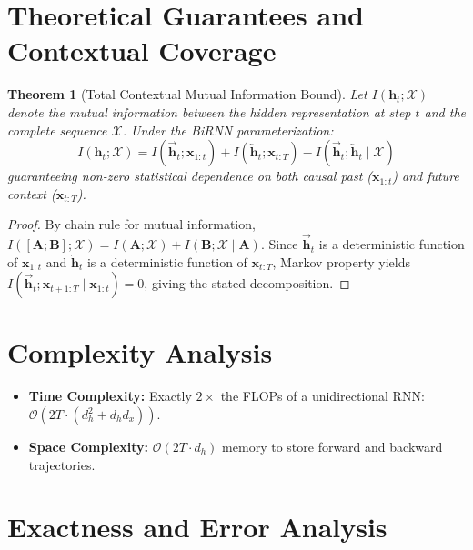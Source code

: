\documentclass[11pt,a4paper]{article}
\newtheorem{theorem}{Theorem}
\theoremstyle{definition}
\begin{document}
\section{Theoretical Guarantees and Contextual Coverage}

\begin{theorem}[Total Contextual Mutual Information Bound]
\label{thm:birnn_context}
Let $I(\mathbf{h}_t; \mathcal{X})$ denote the mutual information between the hidden representation at step $t$ and the complete sequence $\mathcal{X}$. Under the BiRNN parameterization:
\begin{equation}
I(\mathbf{h}_t; \mathcal{X}) = I(\overrightarrow{\mathbf{h}}_t; \mathbf{x}_{1:t}) + I(\overleftarrow{\mathbf{h}}_t; \mathbf{x}_{t:T}) - I(\overrightarrow{\mathbf{h}}_t; \overleftarrow{\mathbf{h}}_t \mid \mathcal{X})
\end{equation}
guaranteeing non-zero statistical dependence on both causal past ($\mathbf{x}_{1:t}$) and future context ($\mathbf{x}_{t:T}$).
\end{theorem}

\begin{proof}
By chain rule for mutual information, $I([\mathbf{A}; \mathbf{B}]; \mathcal{X}) = I(\mathbf{A}; \mathcal{X}) + I(\mathbf{B}; \mathcal{X} \mid \mathbf{A})$. Since $\overrightarrow{\mathbf{h}}_t$ is a deterministic function of $\mathbf{x}_{1:t}$ and $\overleftarrow{\mathbf{h}}_t$ is a deterministic function of $\mathbf{x}_{t:T}$, Markov property yields $I(\overrightarrow{\mathbf{h}}_t; \mathbf{x}_{t+1:T} \mid \mathbf{x}_{1:t}) = 0$, giving the stated decomposition.
\end{proof}

\section{Complexity Analysis}

\begin{itemize}
    \item \textbf{Time Complexity:} Exactly $2\times$ the FLOPs of a unidirectional RNN: $\mathcal{O}(2 T \cdot (d_h^2 + d_h d_x))$.
    \item \textbf{Space Complexity:} $\mathcal{O}(2 T \cdot d_h)$ memory to store forward and backward trajectories.
\end{itemize}

\section{Exactness and Error Analysis}
\end{document}
